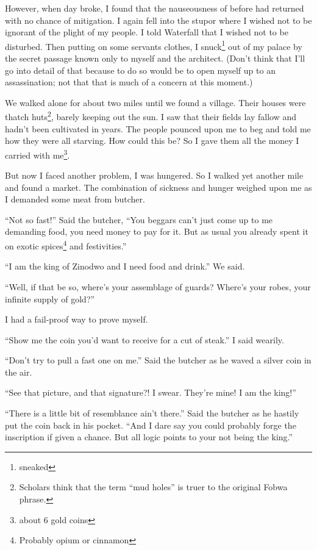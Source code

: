 \tbreak

However, when day broke, I found that the nauseousness of before had returned with no chance of mitigation. I again fell into the stupor where I wished not to be ignorant of the plight of my people. I told Waterfall that I wished not to be disturbed. Then putting on some servants clothes, I snuck\footnote{sneaked} out of my palace by the secret passage known only to myself and the architect. (Don't think that I'll go into detail of that because to do so would be to open myself up to an assassination; not that that is much of a concern at this moment.)

We walked alone for about two miles until we found a village. Their houses were thatch huts\footnote{Scholars think that the term ``mud holes'' is truer to the original Fo\-bwa phrase.}, barely keeping out the sun. I saw that their fields lay fallow and hadn't been cultivated in years. The people pounced upon me to beg and told me how they were all starving. How could this be? So I gave them all the money I carried with me\footnote{about 6 gold coins}.

But now I faced another problem, I was hungered. So I walked yet another mile and found a market. The combination of sickness and hunger weighed upon me as I demanded some meat from butcher.

``Not so fast!'' Said the butcher, ``You beggars can't just come up to me demanding food, you need money to pay for it. But as usual you already spent it on exotic spices\footnote{Probably opium or cinnamon} and festivities.''

``I am the king of Zinodwo and I need food and drink.'' We said.

``Well, if that be so, where's your assemblage of guards? Where's your robes, your infinite supply of gold?''

I had a fail-proof way to prove myself.

``Show me the coin you'd want to receive for a cut of steak.'' I said wearily.

``Don't try to pull a fast one on me.'' Said the butcher as he waved a silver coin in the air.

``See that picture, and that signature?! I swear. They're mine! I am the king!''

``There is a little bit of resemblance ain't there.'' Said the butcher as he hastily put the coin back in his pocket. ``And I dare say you could probably forge the inscription if given a chance. But all logic points to your not being the king.''

